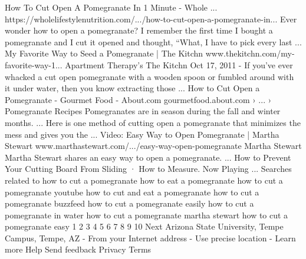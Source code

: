 How To Cut Open A Pomegranate In 1 Minute - Whole ...
https://wholelifestylenutrition.com/.../how-to-cut-open-a-pomegranate-in...
Ever wonder how to open a pomegranate? I remember the first time I bought a pomegranate and I cut it opened and thought, “What, I have to pick every last ...
My Favorite Way to Seed a Pomegranate | The Kitchn
www.thekitchn.com/my-favorite-way-1...
Apartment Therapy's The Kitchn
Oct 17, 2011 - If you've ever whacked a cut open pomegranate with a wooden spoon or fumbled around with it under water, then you know extracting those ...
How to Cut Open a Pomegranate - Gourmet Food - About.com
gourmetfood.about.com › ... › Pomegranate Recipes
Pomegranates are in season during the fall and winter months. ... Here is one method of cutting open a pomegranate that minimizes the mess and gives you the ...
Video: Easy Way to Open Pomegranate | Martha Stewart
www.marthastewart.com/.../easy-way-open-pomegranate
Martha Stewart
Martha Stewart shares an easy way to open a pomegranate. ... How to Prevent Your Cutting Board From Sliding · How to Measure. Now Playing ...
Searches related to how to cut a pomegranate
how to eat a pomegranate
how to cut a pomegranate youtube
how to cut and eat a pomegranate
how to cut a pomegranate buzzfeed
how to cut a pomegranate easily
how to cut a pomegranate in water
how to cut a pomegranate martha stewart
how to cut a pomegranate easy
1	
2
3
4
5
6
7
8
9
10
Next
Arizona State University, Tempe Campus, Tempe, AZ - From your Internet address - Use precise location - Learn more   
Help Send feedback Privacy Terms